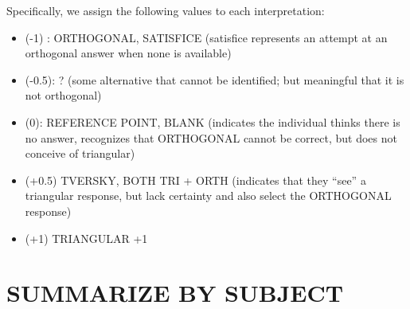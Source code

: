 \documentclass[
  letterpaper,
  DIV=11,
  numbers=noendperiod]{scrreprt}
\newenvironment{Shaded}{\begin{snugshade}}{\end{snugshade}}
\newcommand{\DecValTok}[1]{\textcolor[rgb]{0.68,0.00,0.00}{#1}}
\newcommand{\FloatTok}[1]{\textcolor[rgb]{0.68,0.00,0.00}{#1}}
\newcommand{\FunctionTok}[1]{\textcolor[rgb]{0.28,0.35,0.67}{#1}}
\newcommand{\NormalTok}[1]{\textcolor[rgb]{0.00,0.23,0.31}{#1}}
\newcommand{\OtherTok}[1]{\textcolor[rgb]{0.00,0.23,0.31}{#1}}
\newcommand{\SpecialCharTok}[1]{\textcolor[rgb]{0.37,0.37,0.37}{#1}}
\newcommand{\StringTok}[1]{\textcolor[rgb]{0.13,0.47,0.30}{#1}}
\providecommand{\tightlist}{%
  \setlength{\itemsep}{0pt}\setlength{\parskip}{0pt}}\usepackage{longtable,booktabs,array}
\begin{document}
Specifically, we assign the following values to each interpretation:

\begin{itemize}
\tightlist
\item
  (-1) : ORTHOGONAL, SATISFICE (satisfice represents an attempt at an
  orthogonal answer when none is available)
\item
  (-0.5): ? (some alternative that cannot be identified; but meaningful
  that it is not orthogonal)
\item
  (0): REFERENCE POINT, BLANK (indicates the individual thinks there is
  no answer, recognizes that ORTHOGONAL cannot be correct, but does not
  conceive of triangular)
\item
  (+0.5) TVERSKY, BOTH TRI + ORTH (indicates that they ``see'' a
  triangular response, but lack certainty and also select the ORTHOGONAL
  response)
\item
  (+1) TRIANGULAR +1
\end{itemize}

\begin{Shaded}
\end{Shaded}

\hypertarget{summarize-by-subject}{%
\section{SUMMARIZE BY SUBJECT}\label{summarize-by-subject}}
\end{document}
